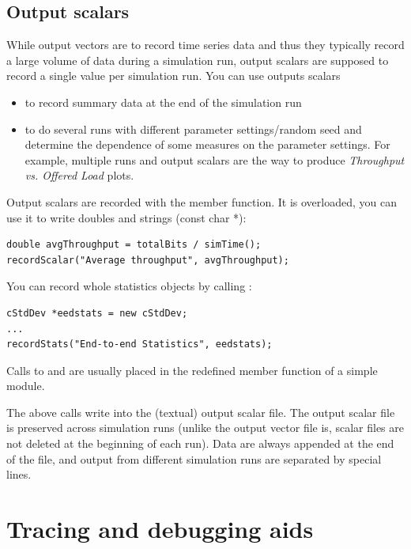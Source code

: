 \subsection{Output scalars}

While output vectors are to record time series data and thus they
typically record a large volume of data during a simulation run,
output scalars are supposed to record a single
value per simulation run. You can use outputs scalars
\begin{itemize}
\item{to record summary data at the end of the simulation run}
\item{to do several runs with different parameter settings/random seed
    and determine the dependence of some measures on the parameter
    settings. For example, multiple runs and output scalars are the
    way to produce \textit{Throughput vs. Offered Load} plots.}
\end{itemize}

Output scalars are recorded with the  member
function.  It is overloaded, you can use it to write doubles and
strings (const char *):

\begin{verbatim}
double avgThroughput = totalBits / simTime();
recordScalar("Average throughput", avgThroughput);
\end{verbatim}

You can record whole statistics objects by calling :

\begin{verbatim}
cStdDev *eedstats = new cStdDev;
...
recordStats("End-to-end Statistics", eedstats);
\end{verbatim}

Calls to  and  are usually
placed in the redefined  member function of a
simple module.

The above calls write into the (textual) output scalar file.  The
output scalar file is preserved across simulation runs (unlike the
output vector file is, scalar files are not deleted at the beginning
of each run). Data are always appended at the end of the file, and
output from different simulation runs are separated by special lines.




\section{Tracing and debugging aids}

